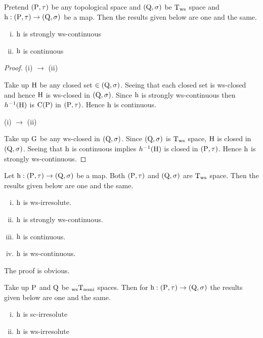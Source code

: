 \begin{thm}\label{thm3.3.15}
Pretend $(\mathrm{P},\tau)$ be any topological space and $(\mathrm{Q},\sigma)$ be $\mathrm{T}_{\mathrm{ws}}$ space and $\mathrm{h}: (\mathrm{P},\tau )\to (\mathrm{Q}, \sigma)$ be a map. Then the results given below are one and the same.
\begin{enumerate}[(i)]
\item $\mathrm{h}$ is strongly ws-continuous
\item $\mathrm{h}$ is continuous
\end{enumerate}
\end{thm}

\begin{proof}
(i) $\to$ (ii)

Take up $\mathrm{H}$ be any closed set $\in (\mathrm{Q},\sigma)$. Seeing that each closed set is ws-closed and hence $\mathrm{H}$ is ws-closed in $(\mathrm{Q},\sigma)$. Since $\mathrm{h}$ is strongly ws-continuous then $h^{-1}(\mathrm{H})$ is $\mathrm{C}(\mathrm{P})$ in $(\mathrm{P}, \tau)$. Hence $\mathrm{h}$ is continuous.

(i) $\to$ (ii)

Take up $\mathrm{G}$ be any ws-closed in $(\mathrm{Q}, \sigma)$. Since $(\mathrm{Q}, \sigma)$ is $\mathrm{T}_{\mathrm{ws}}$ space, $\mathrm{H}$ is closed in $(\mathrm{Q},\sigma)$. Seeing that $\mathrm{h}$ is continuous implies $h^{-1}(\mathrm{H})$ is closed in $(\mathrm{P},\tau)$. Hence $\mathrm{h}$ is strongly ws-continuous.
\end{proof}

\begin{thm}\label{thm3.3.16}
Let $\mathrm{h}: (\mathrm{P},\tau )\to (\mathrm{Q}, \sigma)$ be a map. Both $(\mathrm{P},\tau)$ and $(\mathrm{Q},\sigma)$ are $\mathrm{T}_{\mathrm{ws}}$ space. Then the results given below are one and the same.
\begin{enumerate}[(i)]
\item  $\mathrm{h}$ is ws-irresolute.
\item $\mathrm{h}$ is strongly ws-continuous.
\item $\mathrm{h}$ is continuous.
\item $\mathrm{h}$ is ws-continuous.
\end{enumerate}
The proof is obvious.
\end{thm}

\begin{thm}\label{thm3.3.17}
Take up $\mathrm{P}$ and $\mathrm{Q}$ be $_{\mathrm{ws}}\mathrm{T}_{\text{semi}}$ spaces. Then for $\mathrm{h}: (\mathrm{P},\tau)\to (\mathrm{Q},\sigma)$ the results given below are one and the same.
\begin{enumerate}[(i)]
\item $\mathrm{h}$ is sc-irresolute
\item $\mathrm{h}$ is ws-irresolute
\end{enumerate}
\end{thm}


